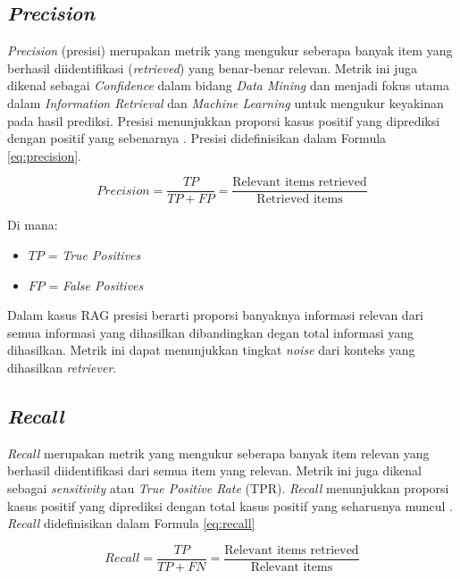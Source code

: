 \subsection{\textit{Precision}}
\textit{Precision} (presisi) merupakan metrik yang mengukur seberapa banyak item yang berhasil diidentifikasi (\textit{retrieved}) yang benar-benar relevan.
Metrik ini juga dikenal sebagai \textit{Confidence} dalam bidang \textit{Data Mining} dan menjadi fokus utama dalam \textit{Information Retrieval} dan \textit{Machine Learning} untuk mengukur keyakinan pada hasil prediksi.
Presisi menunjukkan proporsi kasus positif yang diprediksi dengan positif yang sebenarnya \cite{powers2020evaluationprecisionrecallfmeasure}.
Presisi didefinisikan dalam Formula \ref{eq:precision}.

\begin{equation}
	\label{eq:precision}
	Precision = \frac{TP}{TP + FP} = \frac{\text{Relevant items retrieved}}{\text{Retrieved items}}
\end{equation}

Di mana:
\begin{itemize}
	\item $TP$ = \textit{True Positives}
	\item $FP$ = \textit{False Positives}
\end{itemize}

Dalam kasus RAG presisi berarti proporsi banyaknya informasi relevan dari semua informasi yang dihasilkan dibandingkan degan total informasi yang dihasilkan.
Metrik ini dapat menunjukkan tingkat \textit{noise} dari konteks yang dihasilkan \textit{retriever}.

\subsection{\textit{Recall}}

\textit{Recall} merupakan metrik yang mengukur seberapa banyak item relevan yang berhasil diidentifikasi dari semua item yang relevan.
Metrik ini juga dikenal sebagai \textit{sensitivity} atau \textit{True Positive Rate} (TPR).
\textit{Recall} menunjukkan proporsi kasus positif yang diprediksi dengan total kasus positif yang seharusnya muncul \cite{powers2020evaluationprecisionrecallfmeasure}.
\textit{Recall} didefinisikan dalam Formula \ref{eq:recall}

\begin{equation}
	\label{eq:recall}
	Recall = \frac{TP}{TP + FN} = \frac{\text{Relevant items retrieved}}{\text{Relevant items}}
\end{equation}

